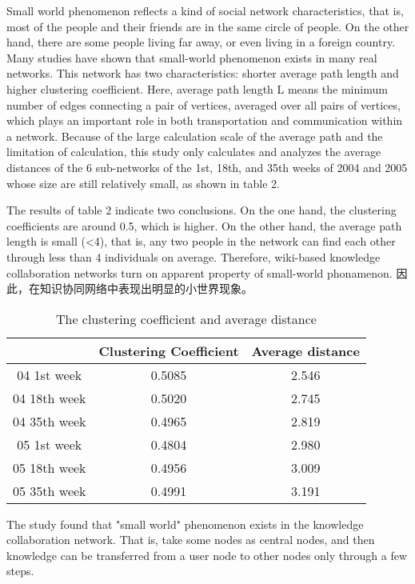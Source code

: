 \documentclass{elsarticle}
\begin{document}
Small world phenomenon reflects a kind of social network characteristics, that is, most of the people and their friends are in the same circle of people. On the other hand, there are some people living far away, or even living in a foreign country. Many studies have shown that small-world phenomenon exists in many real networks. This network has two characteristics: shorter average path length and higher clustering coefficient. Here, average path length L means the minimum number of edges connecting a pair of vertices, averaged over all pairs of vertices, which plays an important role in both transportation and communication within a network. Because of the large calculation scale of the average path and the limitation of calculation, this study only calculates and analyzes the average distances of the 6 sub-networks of the 1st, 18th, and 35th weeks of 2004 and 2005 whose size are still relatively small, as shown in table 2.

The results of table 2 indicate two conclusions. On the one hand, the clustering coefficients are around 0.5, which is higher. On the other hand, the average path length is small (<4), that is, any two people in the network can find each other through less than 4 individuals on average. Therefore, wiki-based knowledge collaboration networks turn on apparent property of small-world phonamenon. 因此，在知识协同网络中表现出明显的小世界现象。

\begin{table}[htpb]
  \centering
 \caption{The clustering coefficient and average distance} 
 \begin{tabular}{|c|c|c|}
    &Clustering Coefficient&Average distance\\\hline
  04 1st week&0.5085&2.546\\\hline
  04 18th week&0.5020&2.745\\\hline
  04 35th week&0.4965&2.819\\\hline
  05 1st week&0.4804&2.980\\\hline
  05 18th week&0.4956&3.009\\\hline
  05 35th week&0.4991&3.191\\\hline
   \end{tabular}
 
\end{table}
The study found that "small world" phenomenon exists in the knowledge
collaboration network. That is, take some nodes as central nodes, and
then knowledge can be transferred from a user node to other nodes only
through a few steps.
\end{document}
